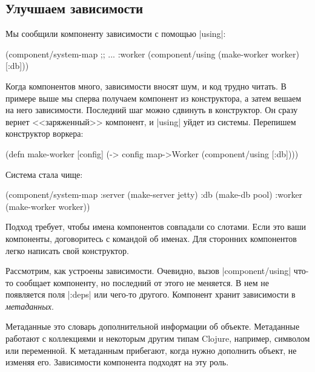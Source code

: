 \subsection{Улучшаем зависимости}

Мы сообщили компоненту зависимости с помощью \spverb|using|:

\begin{english}
  \begin{clojure}
(component/system-map
 ;; ...
 :worker (component/using
          (make-worker worker) [:db]))
  \end{clojure}
\end{english}

Когда компонентов много, зависимости вносят шум, и код трудно читать. В примере
выше мы сперва получаем компонент из конструктора, а затем вешаем на него
зависимости. Последний шаг можно сдвинуть в конструктор. Он сразу вернет
<<заряженный>> компонент, и \spverb|using| уйдет из системы. Перепишем
конструктор воркера:

\begin{english}
  \begin{clojure}
(defn make-worker [config]
  (-> config
      map->Worker
      (component/using [:db])))
  \end{clojure}
\end{english}

Система стала чище:

\begin{english}
  \begin{clojure}
(component/system-map
 :server (make-server jetty)
 :db     (make-db pool)
 :worker (make-worker worker))
  \end{clojure}
\end{english}

Подход требует, чтобы имена компонентов совпадали со слотами. Если это ваши
компоненты, договоритесь с командой об именах. Для сторонних компонентов легко
написать свой конструктор.

Рассмотрим, как устроены зависимости. Очевидно, вызов \spverb|component/using|
что-то сообщает компоненту, но последний от этого не меняется. В нем не
появляется поля \spverb|:deps| или чего-то другого. Компонент хранит зависимости
в \emph{метаданных}.

Метаданные это словарь дополнительной информации об объекте. Метаданные работают
с коллекциями и некоторым другим типам Clojure, например, символом или
переменной. К метаданным прибегают, когда нужно дополнить объект, не изменяя
его. Зависимости компонента подходят на эту роль.

